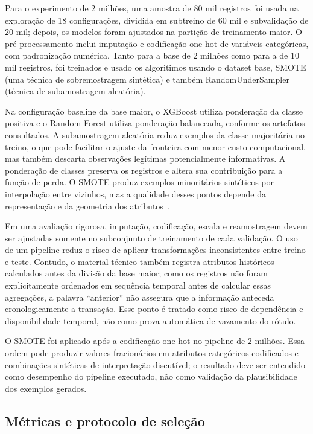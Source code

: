 \documentclass[11pt,a4paper]{article}
\begin{document}
Para o experimento de 2 milhões, uma amostra de 80 mil registros foi usada na exploração de 18 configurações, dividida em subtreino de 60 mil e subvalidação de 20 mil; depois, os modelos foram ajustados na partição de treinamento maior. O pré-processamento inclui imputação e codificação one-hot de variáveis categóricas, com padronização numérica. Tanto para a base de 2 milhões como para a de 10 mil registros, foi treinados e usado os algoritimos usando o dataset base, SMOTE (uma técnica de sobremostragem sintética) e também RandomUnderSampler (técnica de subamostragem aleatória).

Na configuração baseline da base maior, o XGBoost utiliza ponderação da classe positiva e o Random Forest utiliza ponderação balanceada, conforme os artefatos consultados. A subamostragem aleatória reduz exemplos da classe majoritária no treino, o que pode facilitar o ajuste da fronteira com menor custo computacional, mas também descarta observações legítimas potencialmente informativas. A ponderação de classes preserva os registros e altera sua contribuição para a função de perda. O SMOTE produz exemplos minoritários sintéticos por interpolação entre vizinhos, mas a qualidade desses pontos depende da representação e da geometria dos atributos~\cite{Mqadi_SMOTE,ribeiro2023estrategias}.

Em uma avaliação rigorosa, imputação, codificação, escala e reamostragem devem ser ajustadas somente no subconjunto de treinamento de cada validação. O uso de um pipeline reduz o risco de aplicar transformações inconsistentes entre treino e teste. Contudo, o material técnico também registra atributos históricos calculados antes da divisão da base maior; como os registros não foram explicitamente ordenados em sequência temporal antes de calcular essas agregações, a palavra “anterior” não assegura que a informação anteceda cronologicamente a transação. Esse ponto é tratado como risco de dependência e disponibilidade temporal, não como prova automática de vazamento do rótulo.

O SMOTE foi aplicado após a codificação one-hot no pipeline de 2 milhões. Essa ordem pode produzir valores fracionários em atributos categóricos codificados e combinações sintéticas de interpretação discutível; o resultado deve ser entendido como desempenho do pipeline executado, não como validação da plausibilidade dos exemplos gerados.

\subsection{Métricas e protocolo de seleção}
\end{document}
